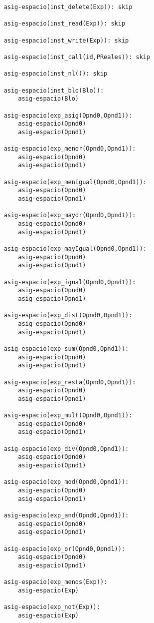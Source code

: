 \begin{lstlisting}
    asig-espacio(inst_delete(Exp)): skip

    asig-espacio(inst_read(Exp)): skip

    asig-espacio(inst_write(Exp)): skip

    asig-espacio(inst_call(id,PReales)): skip

    asig-espacio(inst_nl()): skip

    asig-espacio(inst_blo(Blo)):
        asig-espacio(Blo)

    asig-espacio(exp_asig(Opnd0,Opnd1)):
        asig-espacio(Opnd0)
        asig-espacio(Opnd1)

    asig-espacio(exp_menor(Opnd0,Opnd1)):
        asig-espacio(Opnd0)
        asig-espacio(Opnd1)

    asig-espacio(exp_menIgual(Opnd0,Opnd1)):
        asig-espacio(Opnd0)
        asig-espacio(Opnd1)

    asig-espacio(exp_mayor(Opnd0,Opnd1)):
        asig-espacio(Opnd0)
        asig-espacio(Opnd1)

    asig-espacio(exp_mayIgual(Opnd0,Opnd1)):
        asig-espacio(Opnd0)
        asig-espacio(Opnd1)

    asig-espacio(exp_igual(Opnd0,Opnd1)):
        asig-espacio(Opnd0)
        asig-espacio(Opnd1)

    asig-espacio(exp_dist(Opnd0,Opnd1)):
        asig-espacio(Opnd0)
        asig-espacio(Opnd1)

    asig-espacio(exp_sum(Opnd0,Opnd1)):
        asig-espacio(Opnd0)
        asig-espacio(Opnd1)

    asig-espacio(exp_resta(Opnd0,Opnd1)):
        asig-espacio(Opnd0)
        asig-espacio(Opnd1)

    asig-espacio(exp_mult(Opnd0,Opnd1)):
        asig-espacio(Opnd0)
        asig-espacio(Opnd1)

    asig-espacio(exp_div(Opnd0,Opnd1)):
        asig-espacio(Opnd0)
        asig-espacio(Opnd1)

    asig-espacio(exp_mod(Opnd0,Opnd1)):
        asig-espacio(Opnd0)
        asig-espacio(Opnd1)

    asig-espacio(exp_and(Opnd0,Opnd1)):
        asig-espacio(Opnd0)
        asig-espacio(Opnd1)

    asig-espacio(exp_or(Opnd0,Opnd1)):
        asig-espacio(Opnd0)
        asig-espacio(Opnd1)

    asig-espacio(exp_menos(Exp)):
        asig-espacio(Exp)

    asig-espacio(exp_not(Exp)):
        asig-espacio(Exp)


\end{lstlisting}
